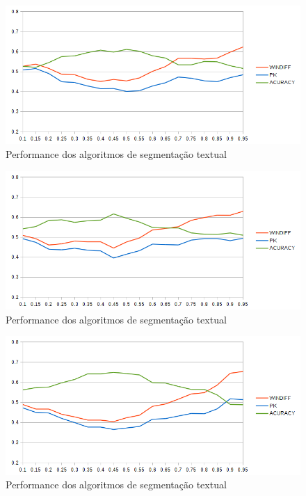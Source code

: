   \begin{figure}[!h]
	  \centering
	  \includegraphics[width=1\textwidth]{conteudo/capitulos/figs/graficos/analiseNSegRate-MinCut.png}
	  \caption{Performance dos algoritmos de segmentação textual}
	  \label{fig:grafico-medidas-tradicionais}
  \end{figure}


  \begin{figure}[!h]
	  \centering
	  \includegraphics[width=1\textwidth]{conteudo/capitulos/figs/graficos/analiseNSegRate-UISeg.png}
	  \caption{Performance dos algoritmos de segmentação textual}
	  \label{fig:grafico-medidas-tradicionais}
  \end{figure}

  \begin{figure}[!h]
	  \centering
	  \includegraphics[width=1\textwidth]{conteudo/capitulos/figs/graficos/analiseNSegRate-Bayes.png}
	  \caption{Performance dos algoritmos de segmentação textual}
	  \label{fig:grafico-medidas-tradicionais}
  \end{figure}

